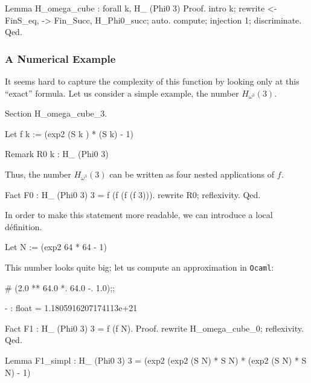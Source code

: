\begin{Coqsrc}
Lemma H_omega_cube : forall k,
    H_ (Phi0 3)%
Proof.
  intro k; rewrite <-FinS_eq, -> Fin_Succ, H_Phi0_succ; auto.
  compute; injection 1; discriminate.
Qed.
\end{Coqsrc}

\subsubsection{A Numerical Example}

It seems hard to capture the complexity of this function by looking only at this
``exact'' formula. 
Let us consider a simple example, the number $H_{\omega^3}(3)$.  

\begin{Coqsrc}
Section H_omega_cube_3.
  
Let f k :=   (exp2 (S k ) * (S k) - 1)%

Remark R0 k :  H_ (Phi0 3)%
\end{Coqsrc}

Thus, the number $H_{\omega^3}(3)$ can be written as four nested applications of $f$.

\begin{Coqsrc}
Fact F0 : H_ (Phi0 3) 3 = f (f (f (f 3))).
 rewrite R0; reflexivity. 
Qed.
\end{Coqsrc}

In order to make this statement more readable, we can introduce a local définition.

\begin{Coqsrc}
Let N := (exp2 64 * 64 - 1)%
\end{Coqsrc}

This number looks quite big; let us compute an approximation in \texttt{Ocaml}:


\begin{Coqsrc}
# (2.0 ** 64.0 *. 64.0 -. 1.0);; 
\end{Coqsrc}

\begin{Coqanswer}
- : float = 1.1805916207174113e+21
\end{Coqanswer}


\begin{Coqsrc}
Fact F1 : H_ (Phi0 3) 3 = f (f N).
Proof.
 rewrite H_omega_cube_0; reflexivity. 
Qed.


Lemma F1_simpl : H_ (Phi0 3) 3 =
                 (exp2 (exp2 (S N) * S N) * (exp2 (S N) * S N) - 1)%

\end{Coqsrc}


